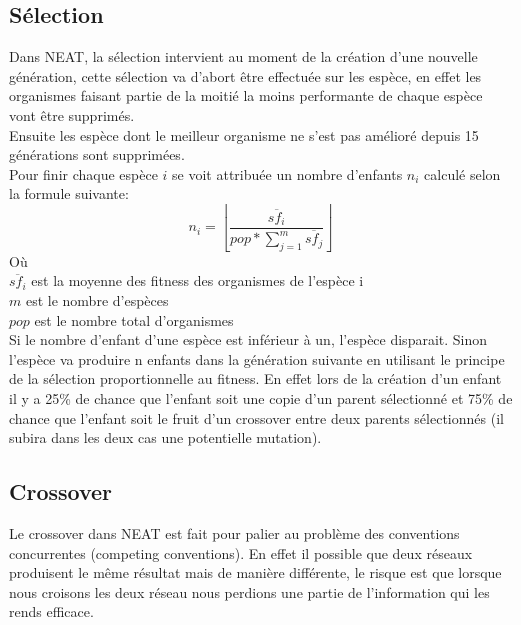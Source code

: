 \documentclass{article}
\begin{document}
\subsection{Sélection}

Dans NEAT, la sélection intervient au moment de la création d'une nouvelle génération, cette sélection va d'abort être effectuée sur les espèce, en effet les organismes faisant partie de la moitié la moins performante de chaque espèce vont être supprimés.\\
Ensuite les espèce dont le meilleur organisme ne s'est pas amélioré depuis 15 générations sont supprimées.\\
Pour finir chaque espèce $i$ se voit attribuée un nombre d'enfants $n_i$ calculé selon la formule suivante:
\begin{equation}
	n_i = \left\lfloor\frac{\overline{sf_i}}{pop * \sum^m_{j=1} \overline{sf_j}}\right\rfloor
\end{equation}
Où\\
$\overline{sf_i}$ est la moyenne des fitness des organismes de l'espèce i\\
$m$ est le nombre d'espèces\\
$pop$ est le nombre total d'organismes\\

Si le nombre d'enfant d'une espèce est inférieur à un, l'espèce disparait. Sinon l'espèce va produire n enfants dans la génération suivante en utilisant le principe de la sélection proportionnelle au fitness. En effet lors de la création d'un enfant il y a 25\% de chance que l'enfant soit une copie d'un parent sélectionné et 75\% de chance que l'enfant soit le fruit d'un crossover entre deux parents sélectionnés (il subira dans les deux cas une potentielle mutation).

\subsection{Crossover}

Le crossover dans NEAT est fait pour palier au problème des conventions concurrentes (competing conventions). En effet il possible que deux réseaux produisent le même résultat mais de manière différente, le risque est que lorsque nous croisons les deux réseau nous perdions une partie de l'information qui les rends efficace.
\end{document}
